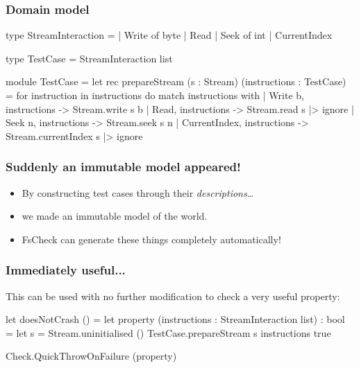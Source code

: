 \documentclass{beamer}
\begin{document}
\begin{frame}[fragile]
\frametitle{Domain model}
\begin{fslisting}
type StreamInteraction =
| Write of byte
| Read
| Seek of int
| CurrentIndex

type TestCase = StreamInteraction list
\end{fslisting}

\end{frame}
\begin{frame}[fragile]
\begin{fslisting}
[<RequireQualifiedAccess>]
module TestCase =
    let rec prepareStream
        (s : Stream)
        (instructions : TestCase)
        =
        for instruction in instructions do
            match instructions with
            | Write b, instructions ->
                Stream.write s b
            | Read, instructions ->
                Stream.read s |> ignore
            | Seek n, instructions ->
                Stream.seek s n
            | CurrentIndex, instructions ->
                Stream.currentIndex s |> ignore

\end{fslisting}
\end{frame}

\begin{frame}
\frametitle{Suddenly an immutable model appeared!}

\begin{itemize}
\item By constructing test cases through their \emph{descriptions}\dots
\item we made an immutable model of the world.
\item FsCheck can generate these things completely automatically!
\end{itemize}
\end{frame}

\begin{frame}[fragile]
\frametitle{Immediately useful...}
This can be used with no further modification to check a very useful property:

\begin{fslisting}
[<Test>]
let doesNotCrash () =
    let property (instructions : StreamInteraction list) : bool =
        let s = Stream.uninitialised ()
        TestCase.prepareStream s instructions
        true

    Check.QuickThrowOnFailure (property)
\end{fslisting}
\end{frame}
\end{document}
